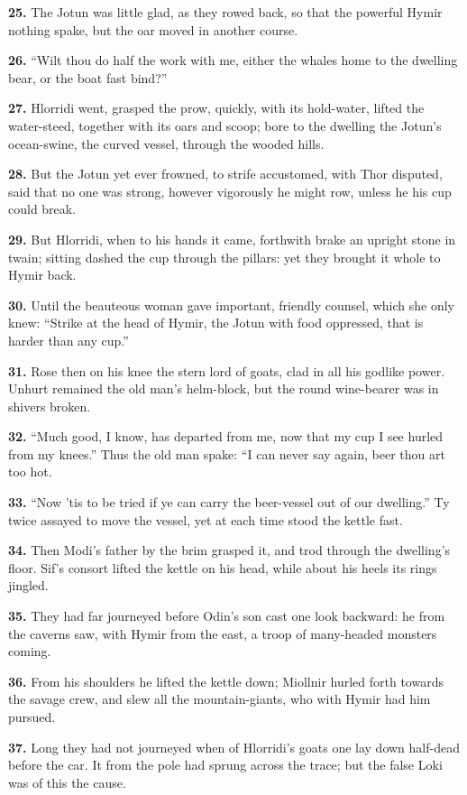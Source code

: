 \textbf{25.} The Jotun was little glad, as they rowed back, so that the
powerful Hymir nothing spake, but the oar moved in another course.

\textbf{26.} ``Wilt thou do half the work with me, either the whales home to
the dwelling bear, or the boat fast bind?''

\textbf{27.} Hlorridi went, grasped the prow, quickly, with its hold-water,
lifted the water-steed, together with its oars and scoop; bore to the
dwelling the Jotun's ocean-swine, the curved vessel, through the
wooded hills.

\textbf{28.} But the Jotun yet ever frowned, to strife accustomed, with Thor
disputed, said that no one was strong, however vigorously he might
row, unless he his cup could break.

\textbf{29.} But Hlorridi, when to his hands it came, forthwith brake an
upright stone in twain; sitting dashed the cup through the pillars:
yet they brought it whole to Hymir back.

\textbf{30.} Until the beauteous woman gave important, friendly counsel,
which she only knew: ``Strike at the head of Hymir, the Jotun with food
oppressed, that is harder than any cup.''

\textbf{31.} Rose then on his knee the stern lord of goats, clad in all his
godlike power. Unhurt remained the old man's helm-block, but the round
wine-bearer was in shivers broken.

\textbf{32.} ``Much good, I know, has departed from me, now that my cup I see
hurled from my knees.'' Thus the old man spake: ``I can never say again,
beer thou art too hot.

\textbf{33.} ``Now 'tis to be tried if ye can carry the beer-vessel out of our
dwelling.'' Ty twice assayed to move the vessel, yet at each time stood
the kettle fast.

\textbf{34.} Then Modi's father by the brim grasped it, and trod through the
dwelling's floor. Sif's consort lifted the kettle on his head, while
about his heels its rings jingled.

\textbf{35.} They had far journeyed before Odin's son cast one look backward:
he from the caverns saw, with Hymir from the east, a troop of
many-headed monsters coming.

\textbf{36.} From his shoulders he lifted the kettle down; Miollnir hurled
forth towards the savage crew, and slew all the mountain-giants, who
with Hymir had him pursued.

\textbf{37.} Long they had not journeyed when of Hlorridi's goats one lay
down half-dead before the car. It from the pole had sprung across the
trace; but the false Loki was of this the cause.


